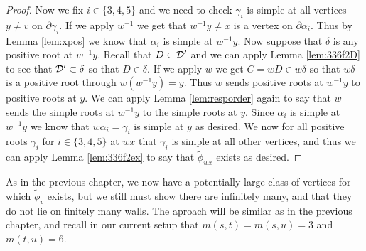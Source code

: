 \documentclass[class=book, crop=false]{standalone}
\begin{document}
\begin{proof}
Now we fix $i\in \{3,4,5\}$ and we need to check $\gamma_i$ is simple at all vertices $y\neq v$ on $\partial\gamma_i.$ If we apply $w^{-1}$ we get that $w^{-1}y\neq x$ is a vertex on $\partial \alpha_i.$ Thus by Lemma \ref{lem:xpos} we know that $\alpha_i$ is simple at $w^{-1}y.$ Now suppose that $\delta$ is any positive root at $w^{-1}y.$ Recall that $D\in \mathcal{D}'$ and we can apply Lemma \ref{lem:336f2D} to see that $\mathcal{D}'\subset \delta$ so that $D\in \delta.$ If we apply $w$ we get $C=wD\in w\delta$ so that $w\delta$ is a positive root through $w(w^{-1}y)=y.$ Thus $w$ sends positive roots at $w^{-1}y$ to positive roots at $y.$ We can apply Lemma \ref{lem:resporder} again to say that $w$ sends the simple roots at $w^{-1}y$ to the simple roots at $y.$ Since $\alpha_i$ is simple at $w^{-1}y$ we know that $w\alpha_i=\gamma_i$ is simple at $y$ as desired. We now for all positive roots $\gamma_i$ for $i\in \{3,4,5\}$ at $wx$ that $\gamma_i$ is simple at all other vertices, and thus we can apply Lemma \ref{lem:336f2ex} to say that $\tilde{\phi}_{wx}$ exists as desired.


\end{proof}

As in the previous chapter, we now have a potentially large class of vertices for which $\tilde{\phi}_v$ exists, but we still must show there are infinitely many, and that they do not lie on finitely many walls. The aproach will be similar as in the previous chapter, and recall in our current setup that $m(s,t)=m(s,u)=3$ and $m(t,u)=6.$
\end{document}
